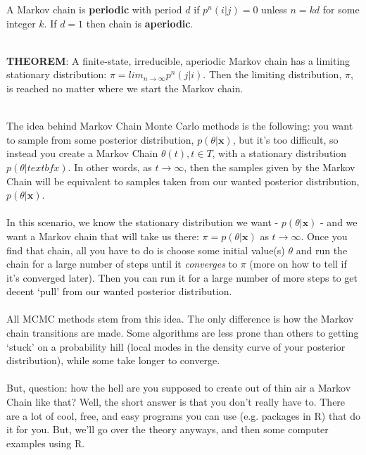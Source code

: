 \documentclass[12pt]{book}
\begin{document}
	A Markov chain is \textbf{periodic} with period $d$ if $p^n(i|j) = 0$ unless $n=kd$ for some integer $k$. If $d=1$ then chain is \textbf{aperiodic}. 
	\\\\
	\begin{adjustwidth}{2em}{2em}
\textbf{THEOREM}: A finite-state, irreducible, aperiodic Markov chain has a limiting stationary distribution: $\pi = lim_{n \to \infty}p^n(j|i)$. Then the limiting distribution, $\pi$, is reached no matter where we start the Markov chain. \\\\ 
	\end{adjustwidth}
	The idea behind Markov Chain Monte Carlo methods is the following: you want to sample from some posterior distribution, $p(\theta|\textbf{x})$, but it's too difficult, so instead you create a Markov Chain ${\theta(t), t \in T}$, with a stationary distribution $p(\theta|textbf{x})$. In other words, as $t \to \infty$, then the samples given by the Markov Chain will be equivalent to samples taken from our wanted posterior distribution, $p(\theta|\textbf{x})$.
	\\\\
	In this scenario, we know the stationary distribution we want - $p(\theta|\textbf{x})$ - and we want a Markov chain that will take us there: $\pi = p(\theta|\textbf{x})$ as $t \to \infty$. Once you find that chain, all you have to do is choose some initial value(s) $\theta$ and run the chain for a large number of steps until it \textit{converges} to $\pi$ (more on how to tell if it's converged later).  Then you can run it for a large number of more steps to get decent `pull' from our wanted posterior distribution.
	\\\\
	All MCMC methods stem from this idea. The only difference is how the Markov chain transitions are made. Some algorithms are less prone than others to getting `stuck' on a probability hill (local modes in the density curve of your posterior distribution), while some take longer to converge.
\\\\
	But, question: how the hell are you supposed to create out of thin air a Markov Chain like that? Well, the short answer is that you don't really have to. There are a lot of cool, free, and easy programs you can use (e.g. packages in R) that do it for you. But, we'll go over the theory anyways, and then some computer examples using R.
	\\\\
\end{document}
